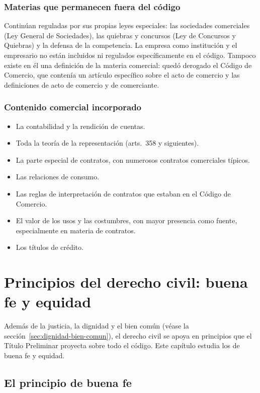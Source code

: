 \documentclass[12pt,oneside]{book}
\begin{document}
\subsection{Materias que permanecen fuera del código}

Continúan reguladas por sus propias leyes especiales: las sociedades comerciales (Ley General de Sociedades), las quiebras y concursos (Ley de Concursos y Quiebras) y la defensa de la competencia. La empresa como institución y el empresario no están incluidos ni regulados específicamente en el código. Tampoco existe en él una definición de la materia comercial: quedó derogado el Código de Comercio, que contenía un artículo específico sobre el acto de comercio y las definiciones de acto de comercio y de comerciante.

\subsection{Contenido comercial incorporado}

\begin{itemize}
\item La contabilidad y la rendición de cuentas.
\item Toda la teoría de la representación (arts.~358 y siguientes).
\item La parte especial de contratos, con numerosos contratos comerciales típicos.
\item Las relaciones de consumo.
\item Las reglas de interpretación de contratos que estaban en el Código de Comercio.
\item El valor de los usos y las costumbres, con mayor presencia como fuente, especialmente en materia de contratos.
\item Los títulos de crédito.
\end{itemize}

\chapter{Principios del derecho civil: buena fe y equidad}
\label{cap:principios}

Además de la justicia, la dignidad y el bien común (véase la sección~\ref{sec:dignidad-bien-comun}), el derecho civil se apoya en principios que el Título Preliminar proyecta sobre todo el código. Este capítulo estudia los de buena fe y equidad.

\section{El principio de buena fe}
\end{document}
